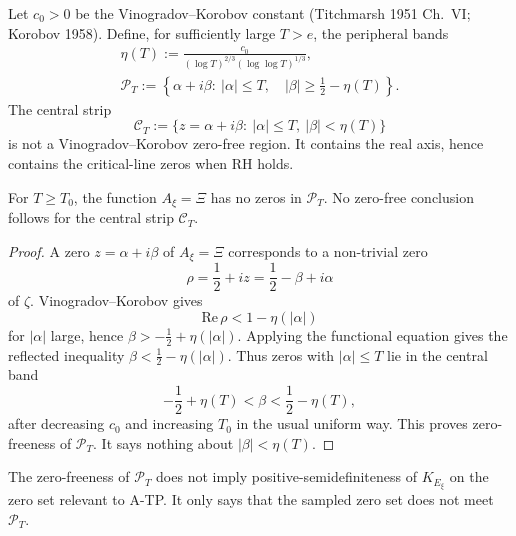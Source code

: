 \begin{definition}
\label{v4-arith:w7-c:def:VK-strip}
Let \(c_{0}>0\) be the Vinogradov--Korobov
constant (Titchmarsh 1951 Ch.~VI; Korobov 1958). Define, for sufficiently large \(T>e\),
the peripheral bands
\begin{equation}
\label{v4-arith:w7-c:eq:VK-strip}
\begin{gathered}
\eta(T):=\frac{c_{0}}{(\log T)^{2/3}(\log\log T)^{1/3}},\\
\mathcal{P}_{T}:=\left\{\alpha+i\beta:\ |\alpha|\leq T,\quad
|\beta|\geq\frac12-\eta(T)\right\}.
\end{gathered}
\end{equation}
The central strip
\[
\mathcal{C}_{T}:=\{z=\alpha+i\beta:\ |\alpha|\leq T,\ |\beta|<\eta(T)\}
\]
is not a Vinogradov--Korobov zero-free region. It contains the real
axis, hence contains the critical-line zeros when RH holds.
\end{definition}

\begin{lemma}
\label{v4-arith:w7-c:lem:E-xi-zero-free-on-strip}
For \(T\geq T_{0}\), the function
\(A_{\xi}=\Xi\) has no zeros in \(\mathcal{P}_{T}\). No zero-free
conclusion follows for the central strip \(\mathcal C_T\).
\end{lemma}

\begin{proof}
A zero \(z=\alpha+i\beta\) of \(A_{\xi}=\Xi\) corresponds to a
non-trivial zero
\[
\rho=\frac12+iz=\frac12-\beta+i\alpha
\]
of \(\zeta\). Vinogradov--Korobov gives
\[
\mathrm{Re}\,\rho<1-\eta(|\alpha|)
\]
for \(|\alpha|\) large, hence
\(\beta>-\tfrac12+\eta(|\alpha|)\). Applying the functional equation
gives the reflected inequality
\(\beta<\tfrac12-\eta(|\alpha|)\). Thus zeros with
\(|\alpha|\leq T\) lie in the central band
\[
-\frac12+\eta(T)<\beta<\frac12-\eta(T),
\]
after decreasing \(c_{0}\) and increasing \(T_{0}\) in the usual
uniform way. This proves zero-freeness of \(\mathcal P_T\). It says
nothing about \(|\beta|<\eta(T)\).
\end{proof}

\begin{proposition}
\label{v4-arith:w7-c:prop:kernel-positive-strip}
The zero-freeness of \(\mathcal P_T\) does
not imply positive-semidefiniteness of \(K_{E_{\xi}}\) on the
zero set relevant to A-TP. It only says that the sampled zero set
does not meet \(\mathcal P_T\).
\end{proposition}

